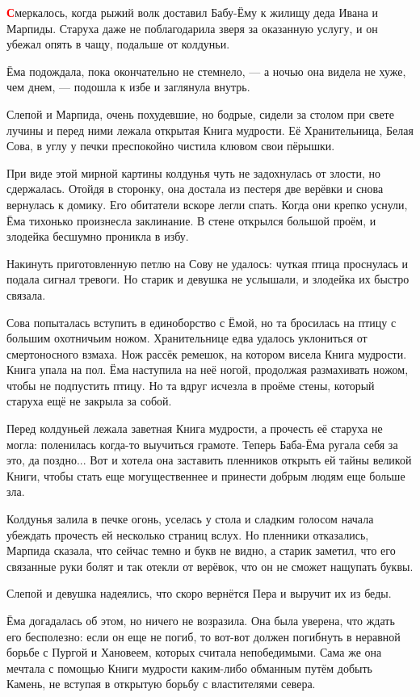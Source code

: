 \documentclass[oneside,final,14pt]{extreport}
\begin{document}
	\lettrine[findent=0pt]{\textbf{\textcolor{red}{С}}}{}меркалось, когда рыжий волк доставил Бабу-Ёму к жилищу деда Ивана и Марпиды. Старуха даже не поблагодарила зверя за оказанную услугу, и он убежал опять в чащу, подальше от колдуньи.
	
	Ёма подождала, пока окончательно не стемнело, — а ночью она видела не хуже, чем днем, — подошла к избе и заглянула внутрь.
	
	Слепой и Марпида, очень похудевшие, но бодрые, сидели за столом при свете лучины и перед ними лежала открытая Книга мудрости. Её Хранительница, Белая Сова, в углу у печки преспокойно чистила клювом свои пёрышки.
	
	При виде этой мирной картины колдунья чуть не задохнулась от злости, но сдержалась. Отойдя в сторонку, она достала из пестеря две верёвки и снова вернулась к домику. Его обитатели вскоре легли спать. Когда они крепко уснули, Ёма тихонько произнесла заклинание. В стене открылся большой проём, и злодейка бесшумно проникла в избу.
	
	Накинуть приготовленную петлю на Сову не удалось: чуткая птица проснулась и подала сигнал тревоги. Но старик и девушка не услышали, и злодейка их быстро связала.
	
	Сова попыталась вступить в единоборство с Ёмой, но та бросилась на птицу с большим охотничьим ножом. Хранительнице едва удалось уклониться от смертоносного взмаха. Нож рассёк ремешок, на котором висела Книга мудрости. Книга упала на пол. Ёма наступила на неё ногой, продолжая размахивать ножом, чтобы не подпустить птицу. Но та вдруг исчезла в проёме стены, который старуха ещё не закрыла за собой.
	
	Перед колдуньей лежала заветная Книга мудрости, а прочесть её старуха не могла: поленилась когда-то выучиться грамоте. Теперь Баба-Ёма ругала себя за это, да поздно... Вот и хотела она заставить пленников открыть ей тайны великой Книги, чтобы стать еще могущественнее и принести добрым людям еще больше зла.
	
	Колдунья залила в печке огонь, уселась у стола и сладким голосом начала убеждать прочесть ей несколько страниц вслух. Но пленники отказались, Марпида сказала, что сейчас темно и букв не видно, а старик заметил, что его связанные руки болят и так отекли от верёвок, что он не сможет нащупать буквы.
	
	Слепой и девушка надеялись, что скоро вернётся Пера и выручит их из беды.
	
	Ёма догадалась об этом, но ничего не возразила. Она была уверена, что ждать его бесполезно: если он еще не погиб, то вот-вот должен погибнуть в неравной борьбе с Пургой и Хановеем, которых считала непобедимыми. Сама же она мечтала с помощью Книги мудрости каким-либо обманным путём добыть Камень, не вступая в открытую борьбу с властителями севера.
	
\end{document}
